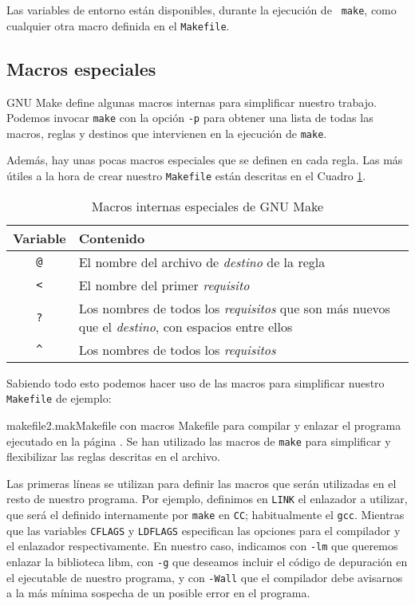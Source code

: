 Las variables de entorno están disponibles, durante la ejecución de {\tt
make}, como cualquier otra macro definida en el {\tt Makefile}.

\subsection{Macros especiales}

{\sf GNU Make} define algunas macros internas para simplificar nuestro
trabajo. Podemos invocar {\tt make} con la opción {\tt -p} para obtener
una lista de todas las macros, reglas y destinos que intervienen en la
ejecución de {\tt make}.

Además, hay unas pocas macros especiales que se definen en cada regla.
Las más útiles a la hora de crear nuestro {\tt Makefile} están descritas
en el Cuadro \ref{makemacro}.

\begin{table}[hbtp]
\begin{tabular}{|c|p{10cm}|}
\hline
Variable & Contenido \\
\hline
{\tt @} & El nombre del archivo de {\em destino} de la regla \\
\verb"<" & El nombre del primer {\em requisito} \\
{\tt ?} & Los nombres de todos los {\em requisitos} que son más nuevos
que el {\em destino}, con espacios entre ellos \\
\verb"^" & Los nombres de todos los {\em requisitos} \\
\hline
\end{tabular}
\caption{Macros internas especiales de {\sf GNU Make}}\label{makemacro}
\end{table}

Sabiendo todo esto podemos hacer uso de las macros para simplificar
nuestro {\tt Makefile} de ejemplo:

\begin{ejemplo}{makefile2.mak}{Makefile con macros}
Makefile para compilar y enlazar el programa ejecutado en la página
\pageref{holafuncm}. Se han utilizado las macros de {\tt make} para
simplificar y flexibilizar las reglas descritas en el archivo.
\end{ejemplo}

Las primeras líneas se utilizan para definir las macros que serán
utilizadas en el resto de nuestro programa. Por ejemplo, definimos en
{\tt LINK} el enlazador a utilizar, que será el definido internamente
por {\tt make} en {\tt CC}; habitualmente el {\tt gcc}. Mientras que las
variables {\tt CFLAGS} y {\tt LDFLAGS} especifican las opciones para el
compilador y el enlazador respectivamente. En nuestro caso, indicamos
con {\tt -lm} que queremos enlazar la biblioteca libm, con {\tt -g} que
deseamos incluir el código de depuración en el ejecutable de nuestro
programa, y con {\tt -Wall} que el compilador debe avisarnos a la más
mínima sospecha de un posible error en el programa.

